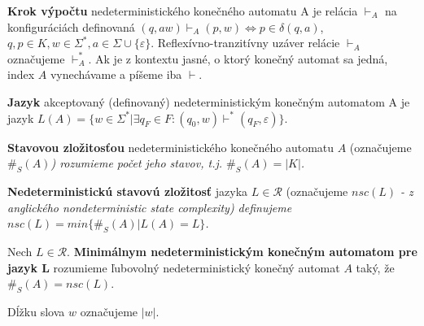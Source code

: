 \begin{definition}
\textbf{Krok výpočtu} nedeterministického konečného automatu A je relácia $ \vdash_A $ na konfiguráciách definovaná $ (q, aw) \vdash_{A} (p,w) \Leftrightarrow p \in \delta(q,a) $, $q,p \in K, w \in \Sigma^*, a \in \Sigma \cup \lbrace \varepsilon \rbrace $. Reflexívno-tranzitívny uzáver relácie $ \vdash_A $ označujeme $ \vdash_{A}^{*} $. Ak je z kontextu jasné, o ktorý konečný automat sa jedná, index $ A $ vynechávame a píšeme iba $ \vdash $.
\end{definition}

\begin{definition}
\textbf{Jazyk} akceptovaný (definovaný) nedeterministickým konečným automatom A je jazyk $ L(A) = \lbrace w \in \Sigma^{*} | \exists q_F \in F: (q_0,w) \vdash^{*} (q_F, \varepsilon) \rbrace $.
\end{definition}

\begin{definition}
\textbf{Stavovou zložitosťou} nedeterministického konečného automatu $ A $ (označujeme \em{}$ \#_S(A) $\em{}) rozumieme počet jeho stavov, t.j. \em{}$ \#_S(A) = |K| $\em{}.
\end{definition}

\begin{definition}
\textbf{Nedeterministickú stavovú zložitosť} jazyka $ L \in \mathscr{R} $ (označujeme \em{}$ nsc(L) $\em{} - z anglického nondeterministic state complexity) definujeme \em{}$ nsc(L)=min \lbrace \#_S(A) | L(A)=L \rbrace $\em{}.
\end{definition}

\begin{definition}
Nech $ L \in \mathscr{R} $. \textbf{Minimálnym nedeterministickým konečným automatom pre jazyk L} rozumieme ľubovolný nedeterministický konečný automat $ A $ taký, že $ \#_S(A)=nsc(L) $.
\end{definition}

\begin{notation}
Dĺžku slova $ w $ označujeme $ |w| $.
\end{notation}

